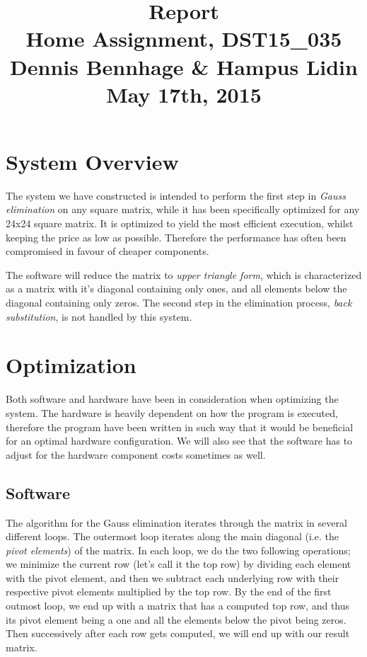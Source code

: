 \documentclass[a4paper,9pt,fleqn]{article}
\title{
{\bf Report}\\
\vspace{0.2cm}
%
Home Assignment, DST15\_035\\
\vspace{1cm}
%
{\large Dennis Bennhage \& Hampus Lidin}\\
\vspace{10cm}
%
May 17th, 2015
}
\date{}
\begin{document}
\maketitle

\newpage

\section{System Overview}
The system we have constructed is intended to perform the first step in {\it Gauss elimination}
on any square matrix, while it has been specifically optimized for any 24x24 square matrix.
It is optimized to yield the most efficient execution, whilst keeping the price as low as
possible. Therefore the performance has often been compromised in favour of cheaper components.

The software will reduce the matrix to {\it upper triangle form}, which is characterized
as a matrix with it's diagonal containing only ones, and all elements below the diagonal
containing only zeros. The second step in the elimination process, {\it back substitution},
is not handled by this system.

\section{Optimization}
Both software and hardware have been in consideration when optimizing the system. The hardware
is heavily dependent on how the program is executed, therefore the program have been 
written in such way that it would be beneficial for an optimal hardware configuration. We will
also see that the software has to adjust for the hardware component costs sometimes as well.

\subsection{Software}
The algorithm for the Gauss elimination iterates through the matrix in several different loops.
The outermost loop iterates along the main diagonal (i.e. the {\it pivot elements}) of the matrix.
In each loop, we do the two following operations; we minimize the current row (let's call it the
top row) by dividing each element with the pivot element, and then we subtract each underlying row
with their respective pivot elements multiplied by the top row. By the end of the first outmost loop,
we end up with a matrix that has a computed top row, and thus its pivot element being a one and all
the elements below the pivot being zeros. Then successively after each row gets computed, we will end
up with our result matrix.
\end{document}
